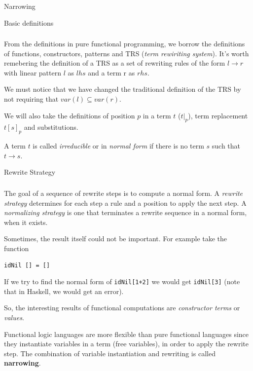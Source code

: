 \documentclass{beamer}
\begin{document}
\begin{section}{Narrowing}
  \begin{subsection}{Basic definitions}
\begin{frame}
\frametitle{\subsecname}
  From the definitions in pure functional programming, we borrow the definitions of functions, constructors, patterns and TRS (\textit{term rewiriting system}). It's worth remebering the definition of a TRS as a set of rewriting rules of the form $l \rightarrow r$ with linear pattern $l$ as $lhs$ and a term r as $rhs$.

  We must notice that we have changed the traditional definition of the TRS by not requiring that $var(l) \subseteq var(r)$.
\end{frame}

\begin{frame}
  We will also take the definitions of position $p$ in a term $t$ ($t|_p$), term replacement $t[s]_p$ and substitutions.

  A term $t$ is called \textit{irreducible} or in \textit{normal form} if there is no term $s$ such that $t \rightarrow s$.
\end{frame}
\end{subsection}

\begin{subsection}{Rewrite Strategy}

  \begin{frame}
\frametitle{\subsecname}
  The goal of a sequence of rewrite steps is to compute a normal form. A \textit{rewrite strategy} determines for each step a rule and a position to apply the next step. A \textit{normalizing strategy} is one that terminates a rewrite sequence in a normal form, when it exists.
\end{frame}

\begin{frame}[fragile]
Sometimes, the result itself could not be important. For example take the function

\begin{verbatim}
idNil [] = []
\end{verbatim}

If we try to find the normal form of \verb|idNil[1+2]| we would get \verb|idNil[3]| (note that in Haskell, we would get an error).

So, the interesting results of functional computations are \textit{constructor terms} or \textit{values}.
\end{frame}

\begin{frame}
Functional logic languages are more flexible than pure functional languages since they instantiate variables in a term (free variables), in order to apply the rewrite step. The combination of variable instantiation and rewriting is called \textbf{narrowing}.
\end{frame}


\end{subsection}
\end{section}
\end{document}
